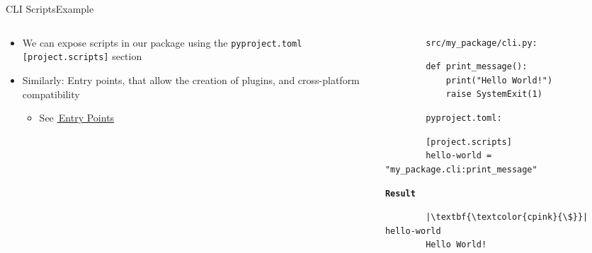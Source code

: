 \begin{splitframe}[fragile]{CLI Scripts}{Example}
  \begin{columns}[t,onlytextwidth]
    \begin{column}{0.58\textwidth}
      \begin{itemize}
        \setlength{\itemsep}{1em}
        \item We can expose scripts in our package using the \texttt{pyproject.toml}
          \texttt{[project.scripts]} section
        \item Similarly: Entry points, that allow the creation of plugins, and cross-platform
          compatibility
          \begin{itemize}
            \item See \href{https://setuptools.pypa.io/en/latest/userguide/entry_point.html}{{\footnotesize{\faExternalLink*}}\,Entry Points}
          \end{itemize}
      \end{itemize}
    \end{column}
    \hfill
    \begin{column}{0.38\textwidth}
      \begin{verbatim}
        src/my_package/cli.py:
      \end{verbatim}
      \vspace{0.25em}
      \begin{verbatim}
        def print_message():
            print("Hello World!")
            raise SystemExit(1)
      \end{verbatim}
      \vspace{1em}
      \begin{verbatim}
        pyproject.toml:
      \end{verbatim}
      \vspace{0.25em}
      \begin{verbatim}
        [project.scripts]
        hello-world = "my_package.cli:print_message"
      \end{verbatim}
      \vspace{1em}
      \begin{center}
        \huge\textcolor{cpink}{\texttt{\textbf{Result}}}
      \end{center}
      \begin{verbatim}
        |\textbf{\textcolor{cpink}{\$}}| hello-world
        Hello World!
      \end{verbatim}
    \end{column}
  \end{columns}
\end{splitframe}


